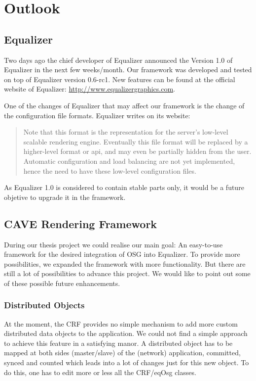 \chapter{Outlook}

\section{Equalizer}

Two days ago the chief developer of Equalizer announced the Version 1.0 of Equalizer in the next few weeks/month. Our framework was developed and tested on top of Equalizer version 0.6-rc1. New features can be found at the official website of Equalizer: \href{http://www.equalizergraphics.com}{http://www.equalizergraphics.com}.

One of the changes of Equalizer that may affect our framework is the change of the configuration file formats. Equalizer writes on its website:

\begin{quote}
	Note that this format is the representation for the server's low-level scalable rendering engine. Eventually this file format will be replaced by a higher-level format or \gls{api}, and may even be partially hidden from the user. Automatic configuration and load balancing are not yet implemented, hence the need to have these low-level configuration files.
\end{quote}

As Equalizer 1.0 is considered to contain stable parts only, it would be a future objetive to upgrade it in the framework.

\section{CAVE Rendering Framework}
During our thesis project we could realise our main goal: An easy-to-use framework for the desired integration of OSG into Equalizer. To provide more possibilities, we expanded the framework with more functionality. But there are still a lot of possibilities to advance this project. We would like to point out some of these possible future enhancements.

\subsection{Distributed Objects}
At the moment, the CRF provides no simple mechanism to add more custom distributed data objects to the application. We could not find a simple approach to achieve this feature in a satisfying manor. A distributed object has to be mapped at both sides (master/slave) of the (network) application, committed, synced and counted which leads into a lot of changes just for this new object. To do this, one has to edit more or less all the CRF/eqOsg classes.

